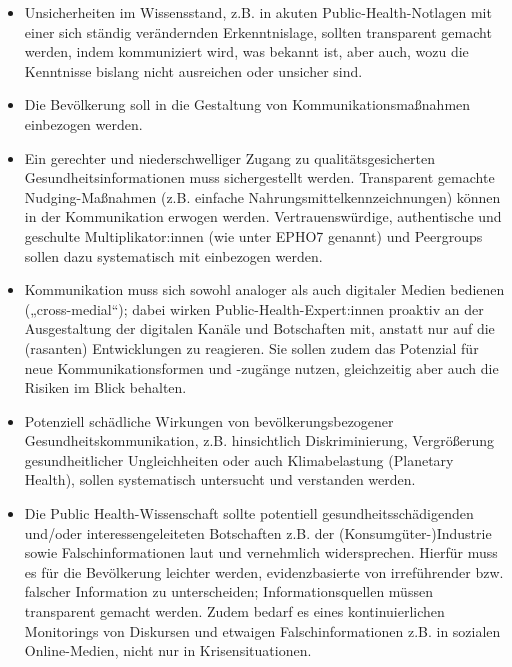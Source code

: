 \documentclass{article}
\begin{document}
\begin{itemize}
\item Unsicherheiten im Wissensstand, z.B. in akuten Public-Health-Notlagen mit einer sich ständig verändernden Erkenntnislage, sollten transparent gemacht werden, indem kommuniziert wird, was bekannt ist, aber auch, wozu die Kenntnisse bislang nicht ausreichen oder unsicher sind.


\item Die Bevölkerung soll in die Gestaltung von Kommunikationsmaßnahmen einbezogen werden.


\item Ein gerechter und niederschwelliger Zugang zu qualitätsgesicherten Gesundheitsinformationen muss sichergestellt werden. Transparent gemachte Nudging-Maßnahmen (z.B. einfache Nahrungsmittelkennzeichnungen) können in der Kommunikation erwogen werden. Vertrauenswürdige, authentische und geschulte Multiplikator:innen (wie unter EPHO7 genannt) und Peergroups sollen dazu systematisch mit einbezogen werden. 


\item Kommunikation muss sich sowohl analoger als auch digitaler Medien bedienen („cross-medial“); dabei wirken Public-Health-Expert:innen proaktiv an der Ausgestaltung der digitalen Kanäle und Botschaften mit, anstatt nur auf die (rasanten) Entwicklungen zu reagieren. Sie sollen zudem das Potenzial für neue Kommunikationsformen und -zugänge nutzen, gleichzeitig aber auch die Risiken im Blick behalten. 


\item Potenziell schädliche Wirkungen von bevölkerungsbezogener Gesundheitskommunikation, z.B. hinsichtlich Diskriminierung, Vergrößerung gesundheitlicher Ungleichheiten oder auch Klimabelastung (Planetary Health), sollen systematisch untersucht und verstanden werden.


\item Die Public Health-Wissenschaft sollte potentiell gesundheitsschädigenden und/oder interessengeleiteten Botschaften z.B. der (Konsumgüter-)Industrie sowie Falschinformationen laut und vernehmlich widersprechen. Hierfür muss es für die Bevölkerung leichter werden, evidenzbasierte von irreführender bzw. falscher Information zu unterscheiden; Informationsquellen müssen transparent gemacht werden. Zudem bedarf es eines kontinuierlichen Monitorings von Diskursen und etwaigen Falschinformationen z.B. in sozialen Online-Medien, nicht nur in Krisensituationen.


\end{itemize}
\end{document}

